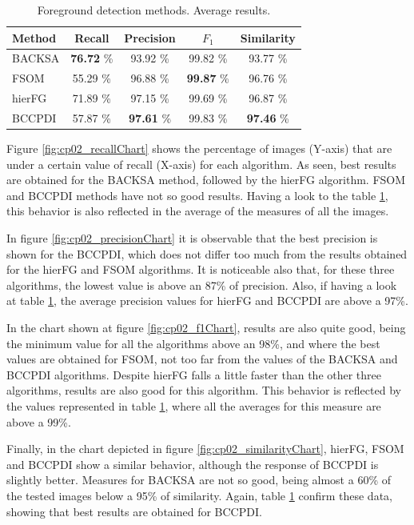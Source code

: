 \begin{table}[t]
\begin{center}
\resizebox{0.5\columnwidth}{!} {
\begin{tabular}{|l|c|c|c|c|}
\hline
Method & Recall & Precision & $F_1$ & Similarity \\
\hline
BACKSA & \textbf{76.72} \% & 93.92 \% & 99.82 \% & 93.77 \% \\
FSOM & 55.29 \% & 96.88 \% & \textbf{99.87} \% & 96.76 \% \\
hierFG & 71.89 \% & 97.15 \% & 99.69 \% & 96.87 \% \\
BCCPDI & 57.87 \% & \textbf{97.61} \% & 99.83 \% & \textbf{97.46} \% \\
\hline
\end{tabular}
}
\caption{Foreground detection methods. Average results.}\label{table:fgAverage}
\end{center}
\end{table}

Figure \ref{fig:cp02_recallChart} shows the percentage of images (Y-axis) that are under a certain value of recall (X-axis) 
for each algorithm. As seen, best results are obtained for the BACKSA method, followed by the hierFG algorithm.  FSOM 
and BCCPDI methods have not so good results. Having a look to the table \ref{table:fgAverage}, this behavior is also 
reflected in the average of the measures of all the images.

In figure \ref{fig:cp02_precisionChart} it is observable that the best precision is shown for the BCCPDI, which does not 
differ too much from the results obtained for the hierFG and FSOM algorithms. It is noticeable also that, for these 
three algorithms, the lowest value is above an 87\% of precision. Also, if having a look at table \ref{table:fgAverage}, 
the average precision values for hierFG and BCCPDI are above a 97\%.

In the chart shown at figure \ref{fig:cp02_f1Chart}, results are also quite good, being the minimum value for all the 
algorithms above an 98\%, and where the best values are obtained for FSOM, not too far from the values of the BACKSA and 
BCCPDI algorithms. Despite hierFG falls a little faster than the other three algorithms, results are also good for this 
algorithm. This behavior is reflected by the values represented in table \ref{table:fgAverage}, where all the averages 
for this measure are above a 99\%.

Finally, in the chart depicted in figure \ref{fig:cp02_similarityChart}, hierFG, FSOM and BCCPDI show a similar behavior, 
although the response of BCCPDI is slightly better. Measures for BACKSA are not so good, being almost a 60\% of the 
tested images below a 95\% of similarity. Again, table \ref{table:fgAverage} confirm these data, showing that best 
results are obtained for BCCPDI.

